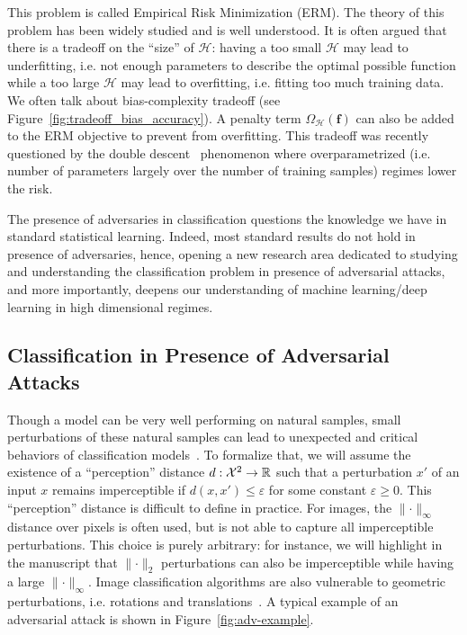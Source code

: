 This problem is called Empirical Risk Minimization (ERM). The theory of this problem has been widely studied and is well understood. It is often argued that there is a tradeoff on the ``size'' of $\mathcal{H}$: having a too small $\mathcal{H}$ may lead to underfitting, i.e. not enough parameters to describe the optimal possible function while a too large $\mathcal{H}$ may lead to overfitting, i.e. fitting too much training data. We often talk about bias-complexity tradeoff (see Figure~\ref{fig:tradeoff_bias_accuracy}). A penalty term $\Omega_{\mathcal{H}}(\mathbf{f})$ can also be added to the ERM objective to prevent from overfitting. This tradeoff was recently questioned by the double descent~\citep{belkin2019reconciling} phenomenon where overparametrized (i.e. number of parameters largely over the number of training samples) regimes lower the risk.

The presence of adversaries in classification questions the knowledge we have in standard statistical learning. Indeed, most standard results do not hold in presence of adversaries, hence, opening a new research area dedicated to studying and understanding the classification problem in presence of adversarial attacks, and more importantly, deepens our understanding of  machine learning/deep learning in high dimensional regimes.




\subsection{Classification in Presence of Adversarial Attacks}

Though a model can be very well performing on natural samples, small perturbations of these natural samples can lead to unexpected and critical behaviors of classification models~\citep{biggio2013evasion,Szegedy2013IntriguingPO}. To formalize that, we will assume the existence of a ``perception'' distance $d:\mathcal{X}^2\to\mathbb{R}$ such that a perturbation $x'$ of an input $x$ remains imperceptible if $d(x,x')\leq \varepsilon$ for some constant $\varepsilon\geq0$. This ``perception'' distance is difficult to define in practice. For images, the $\lVert\cdot\rVert_\infty$ distance over pixels is often used, but is not able to capture all imperceptible perturbations.  This choice is purely arbitrary: for instance, we will highlight in the manuscript that $\lVert\cdot\rVert_2$ perturbations can also be imperceptible while having a large $\lVert\cdot\rVert_\infty$. Image classification algorithms are also vulnerable to geometric perturbations, i.e. rotations and translations~\citep{kanbak2018geometric,engstrom2019exploring}. A typical example of an adversarial attack is shown in Figure~\ref{fig:adv-example}.


